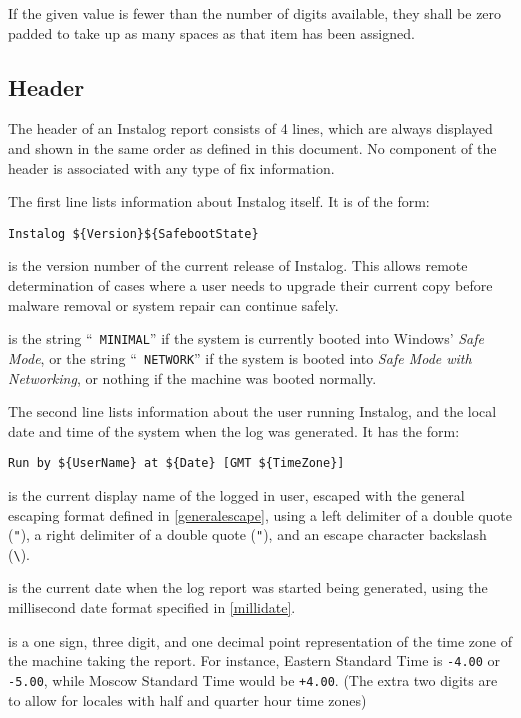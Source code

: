 If the given value is fewer than the number of digits available, they shall be
zero padded to take up as many spaces as that item has been assigned.

\subsection{Header}
The header of an Instalog report consists of 4 lines, which are always displayed
and shown in the same order as defined in this document. No component of the
header is associated with any type of fix information.

The first line lists information about Instalog itself. It is of the form:
\begin{verbatim}
Instalog ${Version}${SafebootState}
\end{verbatim}

 is the version number of the current release of Instalog. This
allows remote determination of cases where a user needs to upgrade their current
copy before malware removal or system repair can continue safely.

 is the string ``\verb| MINIMAL|'' if the system is currently
booted into Windows' \textit{Safe Mode}, or the string ``\verb| NETWORK|'' if
the system is booted into \textit{Safe Mode with Networking}, or nothing if the
machine was booted normally.

The second line lists information about the user running Instalog, and the local
date and time of the system when the log was generated. It has the form:
\begin{verbatim}
Run by ${UserName} at ${Date} [GMT ${TimeZone}]
\end{verbatim}

 is the current display name of the logged in user, escaped with
the general escaping format defined in \ref{generalescape}, using a left
delimiter of a double quote (\verb|"|), a right delimiter of a double
quote (\verb|"|), and an escape character backslash (\verb|\|).

 is the current date when the log report was started being generated,
using the millisecond date format specified in \ref{millidate}.

 is a one sign, three digit, and one decimal point representation
of the time zone of the machine taking the report. For instance, Eastern
Standard Time is \verb|-4.00| or \verb|-5.00|, while Moscow Standard Time would
be \verb|+4.00|. (The extra two digits are to allow for locales with half and
quarter hour time zones)

